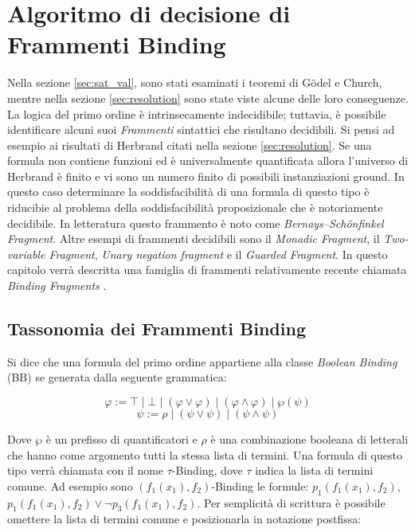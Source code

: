 \documentclass[./main.tex]{subfiles}
\begin{document}
\chapter{Algoritmo di decisione di Frammenti Binding} \label{chap:binding}
Nella sezione \ref{sec:sat_val}, 
sono stati esaminati i teoremi di Gödel e Church, 
mentre nella sezione \ref{sec:resolution} sono state viste alcune delle loro conseguenze. 
La logica del primo ordine è intrinsecamente indecidibile; tuttavia, 
è possibile identificare alcuni suoi \textit{Frammenti} sintattici che risultano decidibili.
Si pensi ad esempio ai risultati di Herbrand citati nella sezione \ref{sec:resolution}.
Se una formula non contiene funzioni ed è universalmente quantificata allora l'universo di Herbrand è finito e 
vi sono un numero finito di possibili instanziazioni ground. 
In questo caso determinare la soddisfacibilità di una formula di questo tipo
è riducibie al problema della soddisfacibilità proposizionale che è notoriamente decidibile.
In letteratura questo frammento è noto come \textit{Bernays–Schönfinkel Fragment}.
Altre esempi di frammenti decidibili sono il \textit{Monadic Fragment}, 
il \textit{Two-variable Fragment}, \textit{Unary negation fragment} e il \textit{Guarded Fragment}.
In questo capitolo verrà descritta una famiglia di frammenti relativamente recente chiamata \textit{Binding Fragments} \cite{binding15} \cite{binding17}.

\section{Tassonomia dei Frammenti Binding} \label{sec:binding_taxonomy}
Si dice che una formula del primo ordine appartiene alla classe \textit{Boolean Binding} (BB) se generata dalla seguente grammatica:

$$ \varphi :=  \top \mid \bot \mid (\varphi \lor \varphi) \mid (\varphi \land \varphi) \mid \wp(\psi) $$
$$ \psi := \rho \mid (\psi \lor \psi) \mid (\psi \land \psi) $$

Dove $\wp$ è un prefisso di quantificatori e $\rho$ è una combinazione booleana di letterali che hanno come argomento 
tutti la stessa lista di termini. 
Una formula di questo tipo verrà chiamata con il nome $\tau$-Binding, dove $\tau$ indica la lista di termini comune.
Ad esempio sono $(f_1(x_1), f_2)$-Binding le formule: 
$p_1(f_1(x_1), f_2)$, $p_1(f_1(x_1), f_2) \lor \lnot p_3(f_1(x_1), f_2)$.
Per semplicità di scrittura è possibile omettere la lista di termini comune e posizionarla in notazione postfissa:
\end{document}
